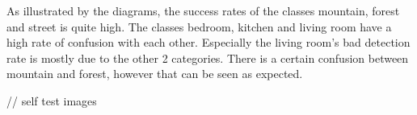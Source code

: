 As illustrated by the diagrams, the success rates of the classes mountain, forest and street is quite high. The classes bedroom, kitchen and living room have a high rate of confusion with each other. Especially the living room's bad detection rate is mostly due to the other 2 categories. There is a certain confusion between mountain and forest, however that can be seen as expected.

// self test images